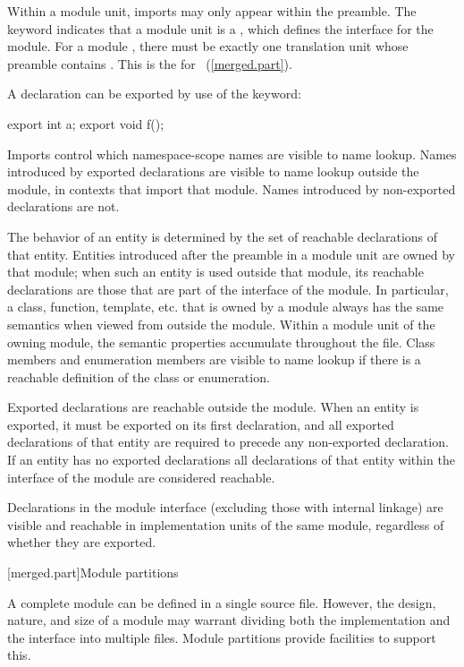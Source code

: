 Within a module unit, imports may only appear within the preamble.
The  keyword indicates that a module unit is a
, which defines the interface for the module.
For a module , there must be exactly one
translation unit whose preamble contains .
This is the 
for ~(\ref{merged.part}).

\pnum
A declaration can be exported by use of the  keyword:
\begin{codeblock}
export int a;
export {
void f();
}
\end{codeblock}
Imports control which namespace-scope names are visible to name lookup.
Names introduced by exported declarations
are visible to name lookup outside the module,
in contexts that import that module.
Names introduced by non-exported declarations are not.

\pnum
The behavior of an entity is determined by
the set of reachable declarations of that entity.
Entities introduced after the preamble in a module unit
are owned by that module;
when such an entity is used outside that module,
its reachable declarations are those
that are part of the interface of the module.
In particular, a class, function, template, etc.
that is owned by a module
always has the same semantics
when viewed from outside the module.
Within a module unit of the owning module,
the semantic properties accumulate throughout the file.
Class members and enumeration members are visible to name lookup
if there is a reachable definition of the class or enumeration.

\pnum
Exported declarations are reachable outside the module.
When an entity is exported,
it must be exported on its first declaration,
and all exported declarations of that entity
are required to precede any non-exported declaration.
If an entity has no exported declarations
all declarations of that entity
within the interface of the module
are considered reachable.
 
\pnum
Declarations in the module interface (excluding those with internal linkage)
are visible and reachable in implementation units of the same module,
regardless of whether they are exported.

[merged.part]{Module partitions}

\pnum
A complete module can be defined in a single source file.
However, the design, nature, and size of a module may warrant
dividing both the implementation and the interface
into multiple files.
Module partitions provide facilities to support this.

